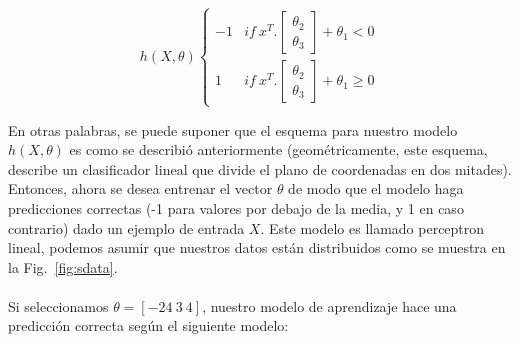     \begin{equation}
        h(X,\theta)\begin{cases}-1 & if\ x^T.\begin{bmatrix}\theta_2\\\theta_3 \end{bmatrix}+\theta_1< 0\\1 & if\ x^T.\begin{bmatrix}\theta_2\\\theta_3 \end{bmatrix}+\theta_1 \geq 0\end{cases}
    \end{equation}

    En otras palabras, se puede suponer que el esquema para nuestro modelo $h(X,\theta)$ es como se describió anteriormente (geométricamente, este esquema, describe un clasificador lineal que divide el plano de coordenadas en dos mitades). Entonces, ahora se desea entrenar el vector $\theta$ de modo que el modelo haga predicciones correctas (-1 para valores por debajo de la media, y 1 en caso contrario) dado un ejemplo de entrada $X$. Este modelo es llamado perceptron lineal, podemos asumir que nuestros datos están distribuidos como se muestra en la Fig.~\ref{fig:sdata}.
    \\\\
    Si seleccionamos $\theta=[-24\ 3\ 4]$, nuestro modelo de aprendizaje hace una predicción correcta según el siguiente modelo:

